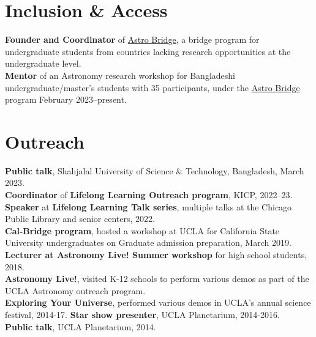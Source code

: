 \documentclass[margin, line]{res}
\begin{document}
\begin{resume}
\section{\sc Inclusion \& Access}
{\bf Founder and Coordinator} of \href{https://www.astrobridge.org/}{Astro Bridge}, a bridge program for undergraduate students from countries lacking research opportunities at the undergraduate level. \\
{\bf Mentor} of an Astronomy research workshop for Bangladeshi undergraduate/master's students with 35 participants, under the \href{https://www.astrobridge.org/projects/bdlensing}{Astro Bridge} program February 2023--present. \\ 

\section{\sc Outreach}
{\bf Public talk}, Shahjalal University of Science \& Technology, Bangladesh, March 2023. \\
{\bf Coordinator} of {\bf Lifelong Learning Outreach program}, KICP, 2022--23. \\
{\bf Speaker} at {\bf Lifelong Learning Talk series}, multiple talks at the Chicago Public Library and senior centers, 2022. \\
{\bf Cal-Bridge program}, hosted a workshop at UCLA for California State University undergraduates on Graduate admission preparation, March 2019. \\
{\bf Lecturer at Astronomy Live! Summer workshop} for high school students, 2018. \\
{\bf Astronomy Live!}, visited K-12 schools to perform various demos as part of the UCLA Astronomy outreach program. \\
{\bf Exploring Your Universe}, performed various demos in UCLA's annual science festival, 2014-17.
{\bf Star show presenter}, UCLA Planetarium, 2014-2016. \\
{\bf Public talk}, UCLA Planetarium, 2014. \\




\end{resume}
\end{document}
